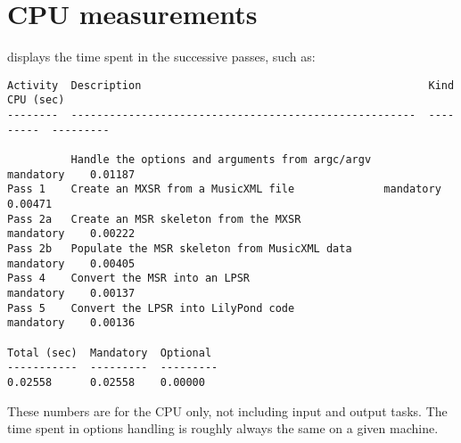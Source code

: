 



\chapter{CPU measurements}

 displays the time spent in the successive passes, such as:
\begin{lstlisting}[language=Terminal]
Activity  Description                                             Kind       CPU (sec)
--------  ------------------------------------------------------  ---------  ---------

          Handle the options and arguments from argc/argv         mandatory    0.01187
Pass 1    Create an MXSR from a MusicXML file              mandatory    0.00471
Pass 2a   Create an MSR skeleton from the MXSR                mandatory    0.00222
Pass 2b   Populate the MSR skeleton from MusicXML data            mandatory    0.00405
Pass 4    Convert the MSR into an LPSR                            mandatory    0.00137
Pass 5    Convert the LPSR into LilyPond code                 mandatory    0.00136

Total (sec)  Mandatory  Optional
-----------  ---------  ---------
0.02558      0.02558    0.00000
\end{lstlisting}

These numbers are for the CPU only, not including input and output tasks.
The time spent in options handling is roughly always the same on a given machine.

